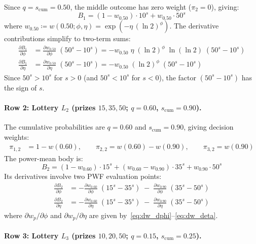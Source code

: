 \documentclass[11pt,a4paper]{article}
\theoremstyle{definition}
\begin{document}
Since $q = s_{\mathrm{cum}} = 0.50$, the middle outcome has zero
weight ($\pi_2 = 0$), giving:
\begin{equation}
    B_1 = (1 - w_{0.50})\cdot 10^s + w_{0.50}\cdot 50^s
\end{equation}
where $w_{0.50} \coloneqq w(0.50;\phi,\eta)
= \exp(-\eta\,(\ln 2)^\phi)$.
The derivative contributions simplify to two-term sums:
\begin{align}
    \frac{\partial B_1}{\partial\phi}
    &= \frac{\partial w_{0.50}}{\partial\phi}\;(50^s - 10^s)
    = -w_{0.50}\;\eta\;(\ln 2)^\phi\;\ln(\ln 2)\;(50^s - 10^s) \\[4pt]
    \frac{\partial B_1}{\partial\eta}
    &= \frac{\partial w_{0.50}}{\partial\eta}\;(50^s - 10^s)
    = -w_{0.50}\;(\ln 2)^\phi\;(50^s - 10^s)
\end{align}
Since $50^s > 10^s$ for $s > 0$ (and $50^s < 10^s$ for $s < 0$), the
factor $(50^s - 10^s)$ has the sign of $s$.

\paragraph{Row 2: Lottery $L_2$ (prizes $15, 35, 50$; $q = 0.60$,
$s_{\mathrm{cum}} = 0.90$).}

The cumulative probabilities are $q = 0.60$ and $s_{\mathrm{cum}} = 0.90$,
giving decision weights:
\begin{align}
    \pi_{1,2} &= 1 - w(0.60), \qquad
    \pi_{2,2} = w(0.60) - w(0.90), \qquad
    \pi_{3,2} = w(0.90)
\end{align}
The power-mean body is:
\begin{equation}
    B_2 = (1 - w_{0.60})\cdot 15^s
    + (w_{0.60} - w_{0.90})\cdot 35^s
    + w_{0.90}\cdot 50^s
\end{equation}
Its derivatives involve two PWF evaluation points:
\begin{align}
    \frac{\partial B_2}{\partial\phi}
    &= -\frac{\partial w_{0.60}}{\partial\phi}\;(15^s - 35^s)
    \;-\; \frac{\partial w_{0.90}}{\partial\phi}\;(35^s - 50^s) \\[4pt]
    \frac{\partial B_2}{\partial\eta}
    &= -\frac{\partial w_{0.60}}{\partial\eta}\;(15^s - 35^s)
    \;-\; \frac{\partial w_{0.90}}{\partial\eta}\;(35^s - 50^s)
\end{align}
where $\partial w_p/\partial\phi$ and $\partial w_p/\partial\eta$
are given by~\eqref{eq:dw_dphi}--\eqref{eq:dw_deta}.

\paragraph{Row 3: Lottery $L_3$ (prizes $10, 20, 50$; $q = 0.15$,
$s_{\mathrm{cum}} = 0.25$).}
\end{document}
